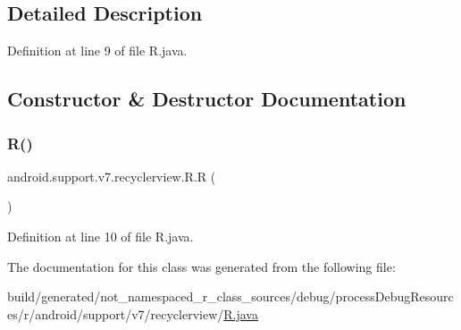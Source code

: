 \subsection{Detailed Description}


Definition at line 9 of file R.\+java.



\subsection{Constructor \& Destructor Documentation}
\mbox{\label{classandroid_1_1support_1_1v7_1_1recyclerview_1_1_r_aa060a454ea7ef2c32580bebc95d5456f}} 
\subsubsection{\texorpdfstring{R()}{R()}}
{\footnotesize\ttfamily android.\+support.\+v7.\+recyclerview.\+R.\+R (\begin{DoxyParamCaption}{ }\end{DoxyParamCaption})\hspace{0.3cm}{\ttfamily [private]}}



Definition at line 10 of file R.\+java.


\begin{DoxyCode}{0}

\end{DoxyCode}


The documentation for this class was generated from the following file\+:\begin{DoxyCompactItemize}
\item 
build/generated/not\+\_\+namespaced\+\_\+r\+\_\+class\+\_\+sources/debug/process\+Debug\+Resources/r/android/support/v7/recyclerview/\mbox{\hyperlink{android_2support_2v7_2recyclerview_2_r_8java}{R.\+java}}\end{DoxyCompactItemize}

